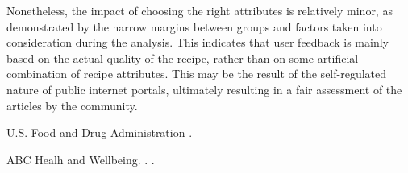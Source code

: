 \documentclass[11pt]{article}
\begin{document}
Nonetheless, the impact of choosing the right attributes is relatively minor, as demonstrated by the narrow margins between groups and factors taken into consideration during the analysis. This indicates that user feedback is mainly based on the actual quality of the recipe, rather than on some artificial combination of recipe attributes. This may be the result of the self-regulated nature of public internet portals, ultimately resulting in a fair assessment of the articles by the community.

\newpage

\begin{thebibliography}{}

{U.S. Food and Drug Administration}
.

{ABC Healh and Wellbeing}.
.
.

\end{thebibliography}
\end{document}

